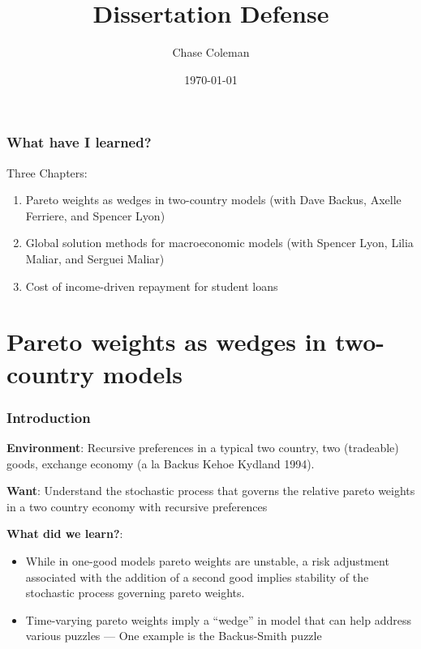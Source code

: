 \documentclass[10pt]{beamer}
\title{Dissertation Defense}
\author{Chase Coleman}
\institute{NYU Stern}
\date[]{\today}
\begin{document}
\begin{frame}
  \thispagestyle{empty}
  \titlepage
\end{frame}

\begin{frame} \frametitle{What have I learned?}

  Three Chapters:

  \vspace{0.5cm}

  \begin{enumerate}
    \item Pareto weights as wedges in two-country models (with Dave Backus, Axelle Ferriere,
          and Spencer Lyon)
    \item Global solution methods for macroeconomic models (with Spencer Lyon, Lilia Maliar, and
          Serguei Maliar)
    \item Cost of income-driven repayment for student loans
  \end{enumerate}

\end{frame}

\section{Pareto weights as wedges in two-country models}

  \begin{frame} \frametitle{Introduction}

    \textbf{Environment}: Recursive preferences in a typical two country, two (tradeable) goods,
    exchange economy (a la Backus Kehoe Kydland 1994).

    \vspace{0.25cm}

    \textbf{Want}: Understand the stochastic process that governs the relative pareto weights in a
    two country economy with recursive preferences

    \vspace{0.5cm}

    \textbf{What did we learn?}:

    \begin{itemize}
        \item While in one-good models pareto weights are unstable, a risk adjustment associated
        with the addition of a second good implies stability of the stochastic process governing
        pareto weights.
        \item Time-varying pareto weights imply a ``wedge'' in model that can help address various
        puzzles --- One example is the Backus-Smith puzzle
    \end{itemize}

  \end{frame}
\end{document}
